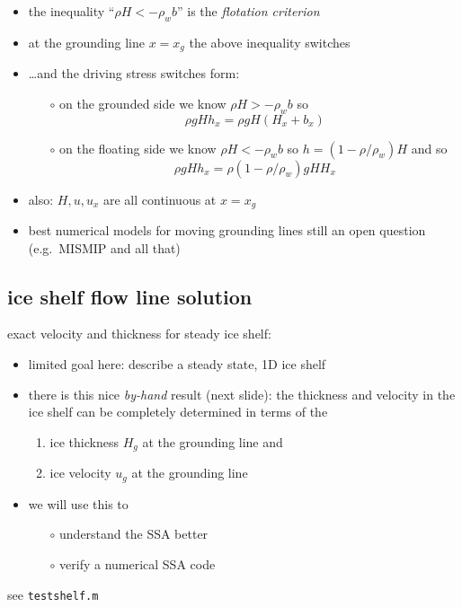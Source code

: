 \documentclass[titlepage,letterpaper,final,12pt]{scrartcl}
\newcommand{\alert}[1]{\emph{#1}}
\begin{document}
\begin{itemize}
\item the inequality ``$\rho H < - \rho_w b$'' is the \alert{flotation criterion}
\item at the grounding line $x=x_g$ the above inequality switches
\item \dots and the driving stress switches form:
  \begin{itemize}
  \item[$\circ$] on the grounded side we know $\rho H > - \rho_w b$ so
  	$$\rho g H h_x = \rho g H (H_x + b_x)$$
  \item[$\circ$] on the floating side we know $\rho H < - \rho_w b$ so $h = (1-\rho/\rho_w) H$ and so
  	$$\rho g H h_x = \rho(1-\rho/\rho_w) g H H_x$$
  \end{itemize}
\item also: $H,u,u_x$ are all continuous at $x=x_g$
\item best numerical models for moving grounding lines still an open question (e.g.~MISMIP and all that)
\end{itemize}


\subsection{ice shelf flow line solution}

exact velocity and thickness for steady ice shelf:
\begin{itemize}
\item limited goal here: describe a steady state, 1D ice shelf
\item there is this nice \alert{by-hand} result (next slide): the thickness and velocity in the ice shelf can be completely determined \cite{MacAyealBarcilon,vanderVeen83} in terms of the 
  \begin{enumerate}
  \item ice thickness $H_g$ at the grounding line and
  \item ice velocity $u_g$ at the grounding line
  \end{enumerate}
\item we will use this to
  \begin{itemize}
  \item[$\circ$] understand the SSA better
  \item[$\circ$] verify a numerical SSA code
  \end{itemize}
\end{itemize}

see \texttt{testshelf.m} 
\end{document}
